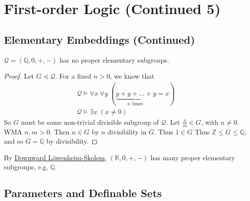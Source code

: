 \documentclass[notoc,notitlepage]{tufte-book}
\begin{document}
\section{First-order Logic (Continued 5)}%
\label{sec:first_order_logic_continued_5}

\subsection{Elementary Embeddings (Continued)}%
\label{sub:elementary_embeddings_continued}

\begin{eg}
  $\mathcal{Q} = (\mathbb{Q}, 0, +, -)$ has no proper elementary subgroups.
\end{eg}

\begin{proof}
  Let $G \preceq \mathcal{Q}$. For a fixed $n > 0$, we know that
  \begin{gather*}
    \mathcal{Q} \models \forall x \; \forall y \; ( \underbrace{y + y + \hdots + y}_{n \text{ times }} = x ) \\
    \mathcal{Q} \models \exists x \; ( x \neq 0 )
  \end{gather*}
  So $G$ must be some non-trivial divisible subgroup of $\mathcal{Q}$. Let $\frac{n}{m} \in G$, with $n \neq 0$. WMA $n, m > 0$. Then $n \in G$ by $n$ divisibility in $G$. Thus $1 \in G$ Thus $\mathbb{Z} \leq G \leq \mathbb{Q}$, and so $G = \mathbb{Q}$ by divisibility.
\end{proof}

\begin{remark}
  By \hyperref[thm:downward_lowenheim_skolem]{Downward L\"{o}wenheim-Skolem}, $(\mathbb{R}, 0, +, -)$ has many proper elementary subgroups, e.g. $\mathbb{Q}$.
\end{remark}


\subsection{Parameters and Definable Sets}%
\label{sub:parameters_and_definable_sets}
\end{document}
